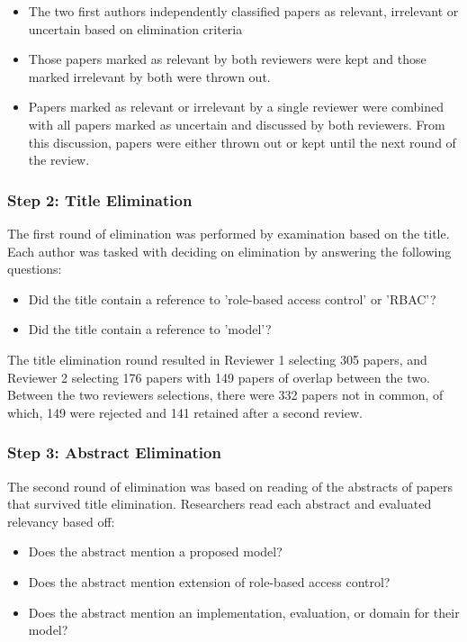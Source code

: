 \begin{itemize}
\setlength{\itemsep}{0.25pt}
\item The two first authors independently classified papers as relevant, irrelevant or uncertain based on elimination criteria
\item Those papers marked as relevant by both reviewers were kept and those marked irrelevant by both were thrown out.
\item Papers marked as relevant or irrelevant by a single reviewer were combined with all papers marked as uncertain and discussed by both reviewers.  From this discussion, papers were either thrown out or kept until the next round of the review.
\end{itemize}

\subsubsection{Step 2: Title Elimination}

The first round of elimination was performed by examination based on the title.  Each author was tasked with deciding on elimination by answering the following questions:

\begin{itemize}
\setlength{\itemsep}{0.25pt}
\item Did the title contain a reference to 'role-based access control' or 'RBAC'? 
\item Did the title contain a reference to 'model'?
\end{itemize}

The title elimination round resulted in Reviewer 1 selecting 305 papers, and Reviewer 2 selecting 176 papers with 149 papers of overlap between the two. 
Between the two reviewers selections, there were 332 papers not in common, of which, 149 were rejected and 141 retained after a second review.

\subsubsection{Step 3: Abstract Elimination}

The second round of elimination was based on reading of the abstracts of papers that survived title elimination.  Researchers read each abstract and evaluated relevancy based off:

\begin{itemize}
\setlength{\itemsep}{0.25pt}
\item Does the abstract mention a proposed model?
\item Does the abstract mention extension of role-based access control?
\item Does the abstract mention an implementation, evaluation, or domain for their model?
\end{itemize}

